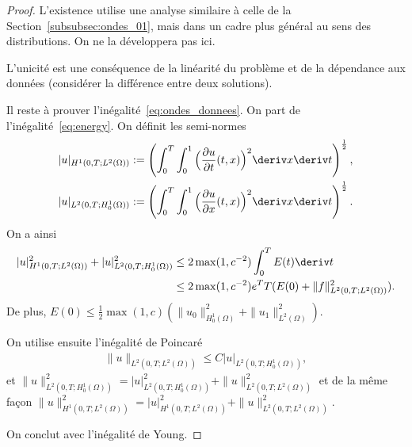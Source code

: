 \documentclass[12pt,a4paper,twoside]{article}
\begin{document}
\begin{proof}
  L'existence utilise une analyse similaire \`a celle de la Section~\ref{subsubsec:ondes_01},
  mais dans un cadre plus g\'en\'eral au sens des distributions.
  On ne la d\'eveloppera pas ici.

  L'unicit\'e est une cons\'equence de la lin\'earit\'e du probl\`eme et
  de la d\'ependance aux donn\'ees (consid\'erer la diff\'erence entre deux solutions).

  Il reste \`a prouver l'in\'egalit\'e~\eqref{eq:ondes_donnees}.
  On part de l'in\'egalit\'e~\eqref{eq:energy}.
  On d\'efinit les semi-normes
  \begin{align*}
    | u |_{H^1(0,T; L^2(\Omega))}
    := \left( \int_0^T \int_0^1 \Big( \dfrac{\partial u}{\partial t}(t,x) \Big)^2 \deriv x \deriv t \right)^{\frac12} ,
    \\
    | u |_{L^2(0,T; H^1_0(\Omega))}
    := \left( \int_0^T \int_0^1 \Big( \dfrac{\partial u}{\partial x}(t,x) \Big)^2 \deriv x \deriv t \right)^{\frac12} .
  \end{align*}
  On a ainsi
  \begin{align*}
    | u |_{H^1(0,T; L^2(\Omega))}^2 + | u |_{L^2(0,T; H^1_0(\Omega))}^2
    &\leq 2\max(1,c^{-2}) \int_0^T E(t) \deriv t
    \\
    &\leq 2\max(1,c^{-2}) e^T T (E(0) + \| f \|_{L^2(0,T; L^2(\Omega))}^2) .
  \end{align*}
  De plus, $E(0) \leq \frac12 \max(1,c) (\| u_0 \|_{H^1_0(\Omega)}^2 + \| u_1 \|_{L^2(\Omega)}^2)$.

  On utilise ensuite l'in\'egalit\'e de Poincar\'e
  \begin{align*}
    \| u \|_{L^2(0,T;L^2(\Omega))} \leq C | u |_{L^2(0,T;H^1_0(\Omega))} ,
  \end{align*}
  et $\| u \|_{L^2(0,T;H^1_0(\Omega))}^2 = | u |_{L^2(0,T;H^1_0(\Omega))}^2 + \| u \|_{L^2(0,T;L^2(\Omega))}^2$
  et de la m\^eme fa\c{c}on
  $\| u \|_{H^1(0,T;L^2(\Omega))}^2 = | u |_{H^1(0,T;L^2(\Omega))}^2 + \| u \|_{L^2(0,T;L^2(\Omega))}^2$.
  
  On conclut avec l'in\'egalit\'e de Young.
\end{proof}
\end{document}
